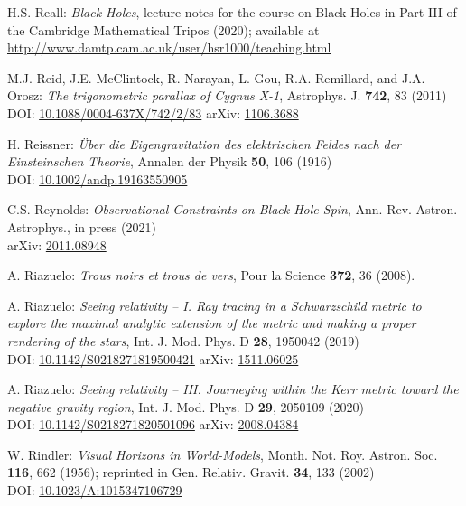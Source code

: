 \begin{thebibliography}{123}
H.S. Reall: {\em Black Holes}, lecture notes for the course on Black Holes in
Part III of the Cambridge Mathematical Tripos (2020); available at\\
\url{http://www.damtp.cam.ac.uk/user/hsr1000/teaching.html}

M.J. Reid, J.E. McClintock, R. Narayan, L. Gou, R.A. Remillard, and J.A. Orosz:
{\em The trigonometric parallax of Cygnus X-1},
Astrophys. J. {\bf 742}, 83 (2011)\\
DOI: \href{https://doi.org/10.1088/0004-637X/742/2/83}{10.1088/0004-637X/742/2/83}\hfill
arXiv: \href{https://arxiv.org/abs/1106.3688}{1106.3688}

H. Reissner:
{\em Über die Eigengravitation des elektrischen Feldes nach der Einsteinschen Theorie},
Annalen der Physik {\bf 50}, 106 (1916)\\
DOI: \href{https://doi.org/10.1002/andp.19163550905}{10.1002/andp.19163550905}

C.S. Reynolds:
{\em Observational Constraints on Black Hole Spin},
Ann. Rev. Astron. Astrophys., in press (2021)\\
arXiv: \href{https://arxiv.org/abs/2011.08948}{2011.08948}

A. Riazuelo:
{\em Trous noirs et trous de vers},
Pour la Science {\bf 372}, 36 (2008).

A. Riazuelo:
{\em Seeing relativity -- I. Ray tracing in a Schwarzschild metric to explore the maximal analytic extension of the metric and making a proper rendering of the stars},
Int. J. Mod. Phys. D {\bf 28}, 1950042 (2019)\\
DOI: \href{https://doi.org/10.1142/S0218271819500421}{10.1142/S0218271819500421}
\hfill
arXiv: \href{https://arxiv.org/abs/1511.06025}{1511.06025}

A. Riazuelo:
{\em Seeing relativity -- III. Journeying within the Kerr metric toward the negative gravity region},
Int. J. Mod. Phys. D {\bf 29}, 2050109 (2020)\\
DOI: \href{https://doi.org/10.1142/S0218271820501096}{10.1142/S0218271820501096}\hfill
arXiv: \href{https://arxiv.org/abs/2008.04384}{2008.04384}

W. Rindler: {\em Visual Horizons in World-Models},
Month. Not. Roy. Astron. Soc. {\bf 116}, 662 (1956);
reprinted in Gen. Relativ. Gravit. {\bf 34}, 133 (2002)\\
DOI: \href{https://doi.org/10.1023/A:1015347106729}{10.1023/A:1015347106729}


\end{thebibliography}
